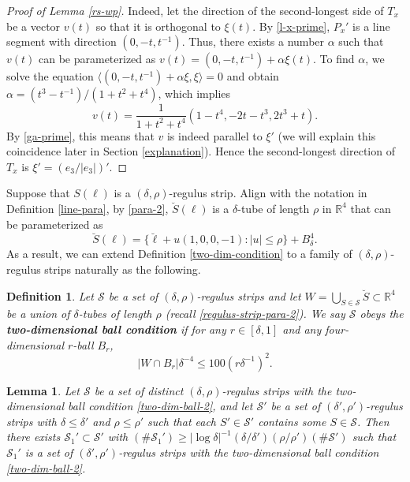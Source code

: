 \documentclass{amsart}%
\numberwithin{equation}{section}
\newtheorem{lemma}[theorem]{Lemma}
\newtheorem{definition}[theorem]{Definition}
\newcommand{\al}{\alpha}
\newcommand{\de}{\delta}
\newcommand{\cs}{\mathcal S}
\newcommand{\ZR}{\mathbb{R}}
\newcommand{\1}{\mathbbm{1}}
\begin{document}
\begin{proof}[Proof of Lemma \ref{rs-wp}]
\smallskip

Indeed, let the direction of the second-longest side of $T_x$ be a vector $v(t)$ so that it is orthogonal to $\xi(t)$.
By \eqref{l-x-prime}, $P_x'$ is a line segment with direction $(0,-t,t^{-1})$.
Thus, there exists a number $\al$ such that $v(t)$ can be parameterized as $v(t)=(0,-t,t^{-1})+\al\xi(t)$.
To find $\al$, we solve the equation $\langle (0,-t,t^{-1})+\al\xi, \xi\rangle=0$ and obtain $\al=(t^3-t^{-1})/(1+t^2+t^4)$, which implies 
\begin{equation}
\label{above-parallel}
    v(t)=\frac{1}{1+t^2+t^4}(1-t^4,-2t-t^3,2t^3+t).
\end{equation}
By \eqref{ga-prime}, this means that $v$ is indeed parallel to $\xi'$ (we will explain this coincidence later in Section \ref{explanation}). Hence the second-longest direction of $T_x$ is $\xi'=(e_3/|e_3|)'$.
\end{proof}


\smallskip

Suppose that $S(\ell)$ is a $(\de,\rho)$-regulus strip. 
Align with the notation in Definition \ref{line-para}, by \eqref{para-2}, $\breve S(\ell)$ is a $\de$-tube of length $\rho$ in $\ZR^4$ that can be parameterized as
\begin{equation}
\label{regulus-strip-para-2}
    \breve S(\ell)=\{\breve\ell+u(1,0,0,-1): |u|\leq\rho\}+B^4_\de.
\end{equation}
As a result, we can extend  Definition \ref{two-dim-condition} to a family of $(\de,\rho)$-regulus strips naturally as the following.

\begin{definition}
\label{two-dim-condition-2}
Let $\cs$ be a set of $(\de,\rho)$-regulus strips and let $W=\bigcup_{S\in\cs}\breve S\subset\ZR^4$ be a union of $\de$-tubes of length $\rho$ (recall \eqref{regulus-strip-para-2}). 
We say $\cs$ obeys the {\bf two-dimensional ball condition} if for any $r\in[\de,1]$ and any four-dimensional $r$-ball $B_r$, 
\begin{equation}
\label{two-dim-ball-2}
    |W\cap B_r|\de^{-4}\leq 100 (r\de^{-1})^2.
\end{equation}
\end{definition}

\begin{lemma}
\label{two-dim-lem}
Let $\cs$ be a set of distinct $(\de,\rho)$-regulus strips with the two-dimensional ball condition \eqref{two-dim-ball-2},
and let $\cs'$ be a set of $(\de',\rho')$-regulus strips with $\de\leq\de'$ and $\rho\leq\rho'$ such that each $S'\in\cs'$ contains some $S\in\cs$. 
Then there exists $\cs_1'\subset\cs'$ with $(\#\cs_1')\geq |\log\de|^{-1}(\de/\de')(\rho/\rho')(\#\cs')$ such that $\cs_1'$ is a set of $(\de',\rho')$-regulus strips with the two-dimensional ball condition \eqref{two-dim-ball-2}.
\end{lemma}
\end{document}
